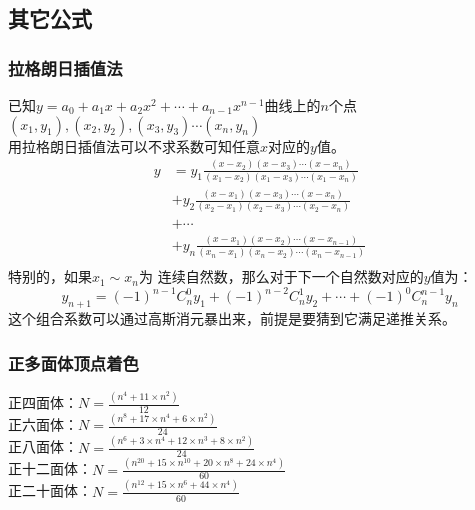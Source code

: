 \subsection{其它公式}
    \subsubsection{拉格朗日插值法}
    已知$y=a_0+a_1x+a_2x^2+\cdots +a_{n-1}x^{n-1}$曲线上的$n$个点$(x_1,y_1),(x_2,y_2),(x_3,y_3)\cdots (x_n,y_n)$\\
    用拉格朗日插值法可以不求系数可知任意$x$对应的$y$值。\\
    \[ \begin{split}
    y &= y_1\frac{(x-x_2)(x-x_3)\cdots (x-x_n)}{(x_1-x_2)(x_1-x_3)\cdots (x_1-x_n)}\\
      &+ y_2\frac{(x-x_1)(x-x_3)\cdots (x-x_n)}{(x_2-x_1)(x_2-x_3)\cdots (x_2-x_n)}\\
      &+ \cdots \\
      &+ y_n\frac{(x-x_1)(x-x_2)\cdots (x-x_{n-1})}{(x_n-x_1)(x_n-x_2)\cdots (x_n-x_{n-1})}\\
    \end{split}\]
    特别的，如果$x_1\sim x_n$为 连续自然数，那么对于下一个自然数对应的$y$值为：\\
    \[y_{n+1}=(-1)^{n-1}C_n^0y_1+(-1)^{n-2}C_n^1y_2+\cdots +(-1)^0C_n^{n-1}y_n\]
    这个组合系数可以通过高斯消元暴出来，前提是要猜到它满足递推关系。\\
    
    \subsubsection{正多面体顶点着色}
	正四面体：$N = \frac{(n^{4}+11\times n^{2})}{12}$\\
	正六面体：$N = \frac{(n^{8}+17\times n^{4}+6\times n^{2})}{24}$\\
	正八面体：$N = \frac{(n^{6}+3\times n^{4}+12\times n^{3}+8\times n^{2})}{24}$\\
	正十二面体：$N = \frac{(n^{20}+15\times n^{10}+20\times n^{8}+24\times n^{4})}{60}$\\
	正二十面体：$N = \frac{(n^{12}+15\times n^{6}+44\times n^{4})}{60}$\\
    
